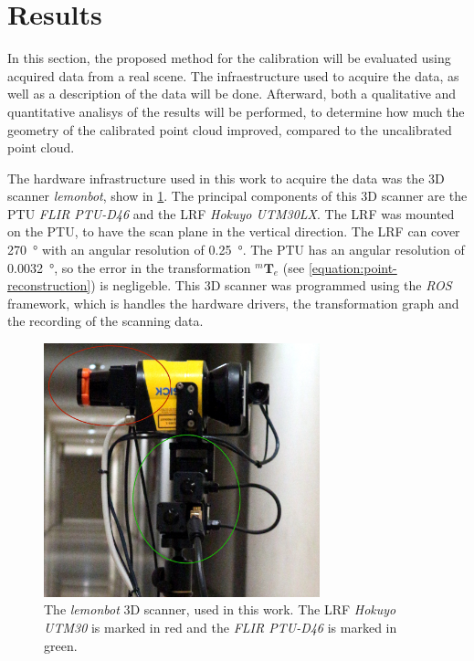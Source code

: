 \documentclass[conference]{IEEEtran}
\begin{document}
\section{Results}
\label{section:results}

In this section, the proposed method for the calibration will be evaluated using acquired data from a real scene. The infraestructure used to acquire the data, as well as a description of the data will be done. Afterward, both a qualitative and quantitative analisys of the results will be performed, to determine how much the geometry of the calibrated point cloud improved, compared to the uncalibrated point cloud. 

The hardware infrastructure used in this work to acquire the data was the 3D scanner \textit{lemonbot}, show in \cref{figure:lemonbot}. The principal components of this 3D scanner are the PTU \textit{FLIR PTU-D46} and the LRF \textit{Hokuyo UTM30LX}. The LRF was mounted on the PTU, to have the scan plane in the vertical direction. The LRF can cover \SI{270}{\degree} with an angular resolution of \SI{0.25}{\degree}. The PTU has an angular resolution of \SI{0.0032}{\degree}, so the error in the transformation $^{m}\mathbf{T}_{e}$ (see \cref{equation:point-reconstruction}) is negligeble. This 3D scanner was programmed using the \textit{ROS} framework, which is handles the hardware drivers, the transformation graph and the recording of the scanning data.

\begin{figure}[h]
    \centering
    \includegraphics[width=8cm]{images/lemonbot-head}
    \caption{The \textit{lemonbot} 3D scanner, used in this work. The LRF \textit{Hokuyo UTM30} is marked in red and the \textit{FLIR PTU-D46} is marked in green.}
    \label{figure:lemonbot}
\end{figure}
\end{document}
